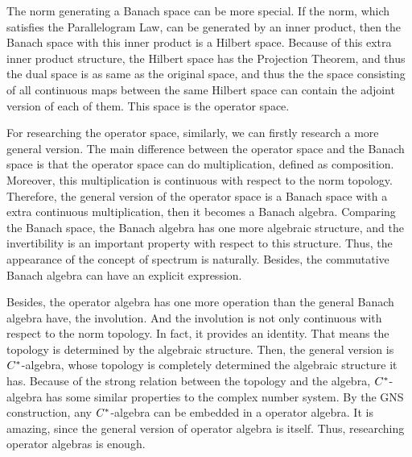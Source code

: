 \documentclass[a4paper,11pt]{report}
\begin{document}
 The norm generating a Banach space can be more special. If the norm, which satisfies the Parallelogram Law, can be generated by an inner product, then the Banach space with this inner product is a Hilbert space. Because of this extra inner product structure, the Hilbert space has the Projection Theorem, and thus the dual space is as same as the original space, and thus the the space consisting of all continuous maps between the same Hilbert space can contain the adjoint version of each of them. This space is the operator space.

For researching the operator space, similarly, we can firstly research a more general version. The main difference between the operator space and the Banach space is that the operator space can do multiplication, defined as composition. Moreover, this multiplication is continuous with respect to the norm topology. Therefore, the general version of the operator space is a Banach space with a extra continuous multiplication, then it becomes a Banach algebra. Comparing the Banach space, the Banach algebra has one more algebraic structure, and the invertibility is an important property with respect to this structure. Thus, the appearance of the concept of spectrum is naturally. Besides, the commutative Banach algebra can have an explicit expression. 

Besides, the operator algebra has one more operation than the general Banach algebra have, the involution. And the involution is not only continuous with respect to the norm topology. In fact, it provides an identity. That means the topology is determined by the algebraic structure. Then, the general version is $C^{*}$-algebra, whose topology is completely determined the algebraic structure it has. Because of the strong relation between the topology and the algebra, $C^{*}$-algebra has some similar properties to the complex number system. By the GNS construction, any $C^{*}$-algebra can be embedded in a operator algebra. It is amazing, since the general version of operator algebra is itself. Thus, researching operator algebras is enough.
\end{document}
